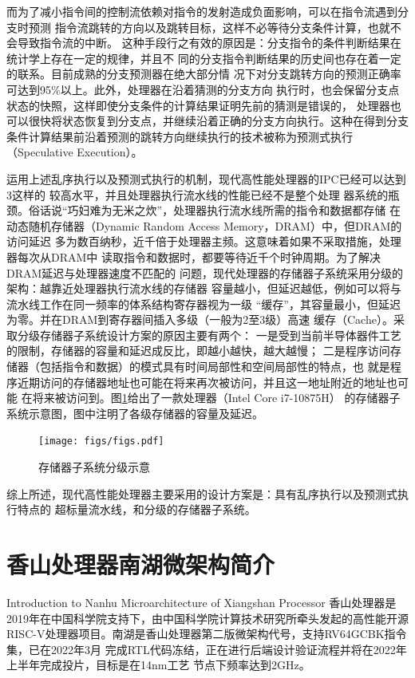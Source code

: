 而为了减小指令间的控制流依赖对指令的发射造成负面影响，可以在指令流遇到分支时预测
指令流跳转的方向以及跳转目标，这样不必等待分支条件计算，也就不会导致指令流的中断。
这种手段行之有效的原因是：分支指令的条件判断结果在统计学上存在一定的规律，并且不
同的分支指令判断结果的历史间也存在着一定的联系。目前成熟的分支预测器在绝大部分情
况下对分支跳转方向的预测正确率可达到95\%以上。此外，处理器在沿着猜测的分支方向
执行时，也会保留分支点状态的快照，这样即使分支条件的计算结果证明先前的猜测是错误的，
处理器也可以很快将状态恢复到分支点，并继续沿着正确的分支方向执行。这种在得到分支
条件计算结果前沿着预测的跳转方向继续执行的技术被称为预测式执行（Speculative Execution）。

运用上述乱序执行以及预测式执行的机制，现代高性能处理器的IPC已经可以达到3这样的
较高水平\cite{zhao2020sonicboom}，并且处理器执行流水线的性能已经不是整个处理
器系统的瓶颈。俗话说“巧妇难为无米之炊”，处理器执行流水线所需的指令和数据都存储
在动态随机存储器（Dynamic Random Access Memory，DRAM）中，但DRAM的访问延迟
多为数百纳秒，近千倍于处理器主频。这意味着如果不采取措施，处理器每次从DRAM中
读取指令和数据时，都要等待近千个时钟周期。为了解决DRAM延迟与处理器速度不匹配的
问题，现代处理器的存储器子系统采用分级的架构：越靠近处理器执行流水线的存储器
容量越小，但延迟越低，例如可以将与流水线工作在同一频率的体系结构寄存器视为一级
“缓存”，其容量最小，但延迟为零。并在DRAM到寄存器间插入多级（一般为2至3级）高速
缓存（Cache）。采取分级存储器子系统设计方案的原因主要有两个：
一是受到当前半导体器件工艺的限制，存储器的容量和延迟成反比，即越小越快，越大越慢；
二是程序访问存储器（包括指令和数据）的模式具有时间局部性和空间局部性的特点，也
就是程序近期访问的存储器地址也可能在将来再次被访问，并且这一地址附近的地址也可能
在将来被访问到。图\ref{fig:mem-heir}给出了一款处理器（Intel Core i7-10875H）
的存储器子系统示意图，图中注明了各级存储器的容量及延迟。

\begin{figure}[ht]
	\centering
	\texttt{[image: figs/figs.pdf]}
	\caption{存储器子系统分级示意}
	\label{fig:mem-heir}
\end{figure}

综上所述，现代高性能处理器主要采用的设计方案是：具有乱序执行以及预测式执行特点的
超标量流水线，和分级的存储器子系统。


\section{香山处理器南湖微架构简介}{Introduction to Nanhu Microarchitecture of Xiangshan Processor}
香山处理器是2019年在中国科学院支持下，由中国科学院计算技术研究所牵头发起的高性能开源
RISC-V处理器项目。南湖是香山处理器第二版微架构代号，支持RV64GCBK指令集，已在2022年3月
完成RTL代码冻结，正在进行后端设计验证流程并将在2022年上半年完成投片，目标是在14nm工艺
节点下频率达到2GHz。

